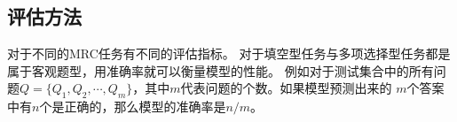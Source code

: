 
\subsection{评估方法}
对于不同的MRC任务有不同的评估指标。
对于填空型任务与多项选择型任务都是属于客观题型，用准确率就可以衡量模型的性能。
例如对于测试集合中的所有问题$Q=\{Q_1,$$Q_2,\cdots,Q_m\}$，其中$m$代表问题的个数。如果模型预测出来的
$m$个答案中有$n$个是正确的，那么模型的准确率是$n/m$。

